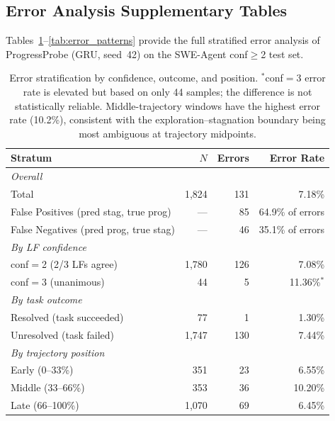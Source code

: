 \subsection{Error Analysis Supplementary Tables}
\label{sec:app_errors}

Tables~\ref{tab:error_summary}--\ref{tab:error_patterns} provide the full stratified error analysis of ProgressProbe (GRU, seed~42) on the SWE-Agent conf${\geq}$2 test set.

\begin{table}[h]
\centering
\small
\begin{tabular}{lrrr}
\toprule
\textbf{Stratum} & \textbf{$N$} & \textbf{Errors} & \textbf{Error Rate} \\
\midrule
\multicolumn{4}{l}{\emph{Overall}} \\
\quad Total & 1,824 & 131 & 7.18\% \\
\quad False Positives (pred stag, true prog) & --- & 85 & 64.9\% of errors \\
\quad False Negatives (pred prog, true stag) & --- & 46 & 35.1\% of errors \\
\midrule
\multicolumn{4}{l}{\emph{By LF confidence}} \\
\quad conf$=$2 (2/3 LFs agree) & 1,780 & 126 & 7.08\% \\
\quad conf$=$3 (unanimous) & 44 & 5 & 11.36\%$^*$ \\
\midrule
\multicolumn{4}{l}{\emph{By task outcome}} \\
\quad Resolved (task succeeded) & 77 & 1 & 1.30\% \\
\quad Unresolved (task failed) & 1,747 & 130 & 7.44\% \\
\midrule
\multicolumn{4}{l}{\emph{By trajectory position}} \\
\quad Early (0--33\%) & 351 & 23 & 6.55\% \\
\quad Middle (33--66\%) & 353 & 36 & 10.20\% \\
\quad Late (66--100\%) & 1,070 & 69 & 6.45\% \\
\bottomrule
\end{tabular}
\caption{Error stratification by confidence, outcome, and position. $^*$conf$=$3 error rate is elevated but based on only 44 samples; the difference is not statistically reliable. Middle-trajectory windows have the highest error rate (10.2\%), consistent with the exploration--stagnation boundary being most ambiguous at trajectory midpoints.}
\label{tab:error_summary}
\end{table}

